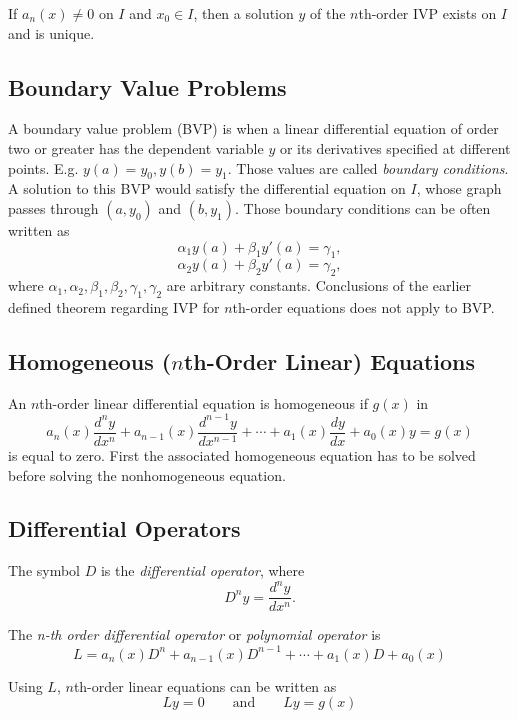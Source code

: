 \begin{theorem}
    If $a_n(x) \ne 0$ on $I$ and $x_0 \in I$, then a solution $y$ of the $n$th-order IVP exists on $I$ and is unique.
\end{theorem}

\subsection{Boundary Value Problems}

A boundary value problem (BVP) is when a linear differential equation of order two or greater has the dependent variable $y$ or its derivatives specified at different points. E.g. $y(a) = y_0, y(b) = y_1$. Those values are called \textit{boundary conditions}. A solution to this BVP would satisfy the differential equation on $I$, whose graph passes through $(a, y_0)$ and $(b, y_1)$. Those boundary conditions can be often written as
\[
    \alpha_1y(a) + \beta_1y'(a) = \gamma_1,
\]
\[
    \alpha_2y(a) + \beta_2y'(a) = \gamma_2,
\]
where $\alpha_1, \alpha_2, \beta_1, \beta_2, \gamma_1, \gamma_2$ are arbitrary constants. Conclusions of the earlier defined theorem regarding IVP for $n$th-order equations does not apply to BVP.

\subsection{Homogeneous ($n$th-Order Linear) Equations}

An $n$th-order linear differential equation is homogeneous if $g(x)$ in
\[
    a_n(x)\frac{d^n y}{dx^n} + a_{n-1}(x)\frac{d^{n-1} y}{dx^{n-1}} + \cdots + a_1(x)\frac{dy}{dx} + a_0(x)y = g(x)
\]
is equal to zero. First the associated homogeneous equation has to be solved before solving the nonhomogeneous equation.

\subsection{Differential Operators}

The symbol $D$ is the \textit{differential operator}, where
\[
    D^n y = \frac{d^n y}{dx^n}.
\]

The \textit{n-th order differential operator} or \textit{polynomial operator} is
\[
    L = a_n(x)D^n + a_{n - 1}(x)D^{n - 1} + \cdots + a_1(x)D + a_0(x)
\]

Using $L$, $n$th-order linear equations can be written as
\[
    Ly = 0 \qquad \text{and} \qquad Ly = g(x)
\]


